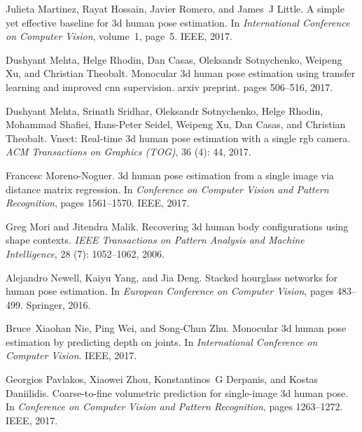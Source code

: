 \documentclass{bmvc2k}
\begin{document}
\begin{thebibliography}{42}
Julieta Martinez, Rayat Hossain, Javier Romero, and James~J Little.
\newblock A simple yet effective baseline for 3d human pose estimation.
\newblock In \emph{International Conference on Computer Vision}, volume~1,
  page~5. IEEE, 2017.

Dushyant Mehta, Helge Rhodin, Dan Casas, Oleksandr Sotnychenko, Weipeng Xu, and
  Christian Theobalt.
\newblock Monocular 3d human pose estimation using transfer learning and
  improved cnn supervision. arxiv preprint.
\newblock pages 506--516, 2017{}.

Dushyant Mehta, Srinath Sridhar, Oleksandr Sotnychenko, Helge Rhodin, Mohammad
  Shafiei, Hans-Peter Seidel, Weipeng Xu, Dan Casas, and Christian Theobalt.
\newblock Vnect: Real-time 3d human pose estimation with a single rgb camera.
\newblock \emph{ACM Transactions on Graphics (TOG)}, 36 (4):
  44, 2017{}.

Francesc Moreno-Noguer.
\newblock 3d human pose estimation from a single image via distance matrix
  regression.
\newblock In \emph{Conference on Computer Vision and Pattern Recognition},
  pages 1561--1570. IEEE, 2017.

Greg Mori and Jitendra Malik.
\newblock Recovering 3d human body configurations using shape contexts.
\newblock \emph{IEEE Transactions on Pattern Analysis and Machine
  Intelligence}, 28 (7): 1052--1062, 2006.

Alejandro Newell, Kaiyu Yang, and Jia Deng.
\newblock Stacked hourglass networks for human pose estimation.
\newblock In \emph{European Conference on Computer Vision}, pages 483--499.
  Springer, 2016.

Bruce~Xiaohan Nie, Ping Wei, and Song-Chun Zhu.
\newblock Monocular 3d human pose estimation by predicting depth on joints.
\newblock In \emph{International Conference on Computer Vision}. IEEE, 2017.

Georgios Pavlakos, Xiaowei Zhou, Konstantinos~G Derpanis, and Kostas
  Daniilidis.
\newblock Coarse-to-fine volumetric prediction for single-image 3d human pose.
\newblock In \emph{Conference on Computer Vision and Pattern Recognition},
  pages 1263--1272. IEEE, 2017.


\end{thebibliography}
\end{document}
